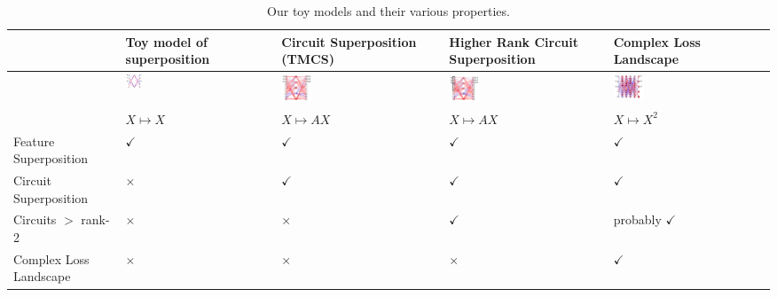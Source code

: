 \documentclass{article}
\theoremstyle{plain}
\theoremstyle{definition}
\theoremstyle{remark}
\begin{document}
\begin{table}[htb]
    \centering
    \begin{tabularx}{\textwidth}{X X X X X}  %
        \toprule
         & Toy model of superposition & Circuit Superposition (TMCS) & Higher Rank Circuit Superposition & Complex Loss Landscape \\  
        \midrule

        \hline
        & \includegraphics[width=0.12\textwidth]{../figures/2a_toy_models_setup.pdf} &
        \includegraphics[width=0.2\textwidth]{../figures/2b_toy_models_setup.pdf} &
        \includegraphics[width=0.2\textwidth]{../figures/2c_toy_models_setup.pdf} &
        \includegraphics[width=0.2\textwidth]{../figures/2d_toy_models_setup.pdf} \\
         & $X \mapsto X$ & $X \mapsto A X$ & $X \mapsto A X$ & $X \mapsto X^2$ \\  
        Feature Superposition & $\checkmark$ & $\checkmark$ & $\checkmark$ & $\checkmark$ \\  
        Circuit Superposition & $\times$ & $\checkmark$ & $\checkmark$ & $\checkmark$ \\  
        Circuits $>$ rank-2 & $\times$ & $\times$ & $\checkmark$ & probably $\checkmark$ \\  
        Complex Loss Landscape & $\times$ & $\times$ & $\times$ & $\checkmark$ \\  
        \bottomrule
    \end{tabularx}
    \caption{Our toy models and their various properties.}
    \label{tab:toy_models}
\end{table}
\end{document}
